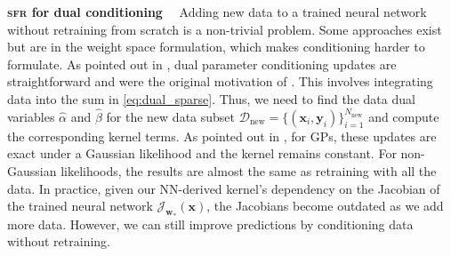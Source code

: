 \documentclass{article}
\renewcommand{\paragraph}[1]{{\bf #1}~~}
\newcommand{\our}{\textsc{sfr}\xspace}
\newcommand{\weights}{\ensuremath{\mathbf{w}}}
\newcommand{\mbf}[1]{\mathbf{#1}}
\newcommand{\MB}{\mbf{B}}
\newcommand{\MZ}{\mbf{Z}}
\newcommand{\T}{\top}
\newcommand{\vz}{\mbf{z}}
\newcommand{\vu}{\mbf{u}}
\newcommand{\vx}{\mbf{x}}
\newcommand{\vy}{\mbf{y}}
\newcommand{\vw}{\mbf{w}}
\newcommand{\Jac}[2]{\mathcal{J}_{#1}(#2)}
\DeclareMathOperator*{\argmin}{arg\,min}
\begin{document}
\paragraph{\our for dual conditioning} Adding new data to a trained neural network without retraining from scratch is a non-trivial problem. Some approaches exist \citep{kirsch2022marginal, spiegelhalter1990sequential} but are in the weight space formulation, which makes conditioning harder to formulate. As pointed out in \cite{chang2022fantasizing}, dual parameter conditioning updates are straightforward and were the original motivation of \cite{csato2002sparse}. This involves integrating data into the sum in \cref{eq:dual_sparse}. Thus, we need to find the data dual variables $\hat{\alpha}$ and $\hat{\beta}$ for the new data subset $\mathcal{D}_\textrm{new} = \{(\vx_i,\vy_i)\}_{i=1}^{N_{\textrm{new}}}$ and compute the corresponding kernel terms. As pointed out in \cite{chang2022fantasizing}, for GPs, these updates are exact under a Gaussian likelihood and the kernel remains constant. For non-Gaussian likelihoods, the results are almost the same as retraining with all the data. In practice, given our NN-derived kernel's dependency on the Jacobian of the trained neural network $\Jac{\weights_*}{\vx}$, the Jacobians become outdated as we add more data. However, we can still improve predictions by conditioning data without retraining. 
\end{document}
